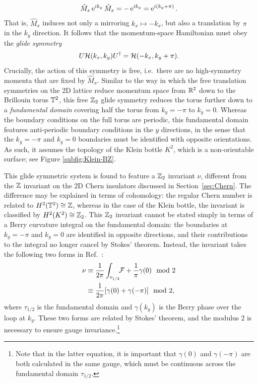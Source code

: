 \begin{equation*}
	\hat{M}_x\operatorname{e}^{ik_y}\hat{M}_x = -\operatorname{e}^{ik_y} = \operatorname{e}^{i(k_y+\pi)}.
\end{equation*}
That is, $\hat{M}_x$ induces not only a mirroring $k_x\mapsto-k_x$, but also a translation by $\pi$ in the $k_y$ direction. It follows that the momentum-space Hamiltonian must obey the \emph{glide symmetry}
\begin{equation}\label{eq:2D_glide}
	U\mathcal{H}(k_x, k_y)U^\dag = \mathcal{H}(-k_x, k_y + \pi).
\end{equation}
Crucially, the action of this symmetry is free, i.e.\ there are no high-symmetry momenta that are fixed by $\hat{M}_x$. Similar to the way in which the free translation symmetries on the 2D lattice reduce momentum space from $\mathbb{R}^2$ down to the Brillouin torus $\mathbb{T}^2$, this free $\mathbb{Z}_2$ glide symmetry reduces the torus further down to a \emph{fundamental domain} covering half the torus from $k_y=-\pi$ to $k_y=0$. Whereas the boundary conditions on the full torus are periodic, this fundamental domain features anti-periodic boundary conditions in the $y$ directions, in the sense that the $k_y=-\pi$ and $k_y=0$ boundaries must be identified with opposite orientations. As such, it assumes the topology of the Klein bottle $K^2$, which is a non-orientable surface; see Figure \ref{subfig:Klein-BZ}.

This glide symmetric system is found to feature a $\mathbb{Z}_2$ invariant $\nu$, different from the $\mathbb{Z}$ invariant on the 2D Chern insulators discussed in Section~\ref{sec:Chern}. The difference may be explained in terms of cohomology: the regular Chern number is related to $H^2(\mathbb{T}^2)\cong\mathbb{Z}$, whereas in the case of the Klein bottle, the invariant is classified by $H^2(K^2)\cong\mathbb{Z}_2$. This $\mathbb{Z}_2$ invariant cannot be stated simply in terms of a Berry curvature integral on the fundamental domain: the boundaries at $k_y=-\pi$ and $k_y=0$ are identified in opposite directions, and their contributions to the integral no longer cancel by Stokes' theorem. Instead, the invariant takes the following two forms in Ref.~\cite{CYZ_Klein-gauge}:
\begin{align}
	\nu &\equiv \frac{1}{2\pi}\int_{\tau_{1/2}}\!\!\mathcal{F} + \frac{1}{\pi}\gamma(0) \mod 2 \label{eq:z2-inv1} \\
		&\equiv \frac{1}{2\pi}[\gamma(0) + \gamma(-\pi)]\mod 2, \label{eq:z2-inv2}
\end{align}
where $\tau_{1/2}$ is the fundamental domain and $\gamma(k_y)$ is the Berry phase over the loop at $k_y$. These two forms are related by Stokes' theorem, and the modulus 2 is necessary to ensure gauge invariance.\footnote{
	Note that in the latter equation, it is important that $\gamma(0)$ and $\gamma(-\pi)$ are both calculated in the same gauge, which must be continuous across the fundamental domain $\tau_{1/2}$.}

